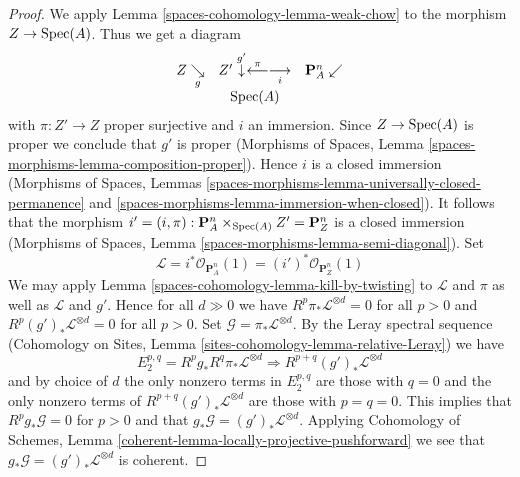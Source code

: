 \begin{proof}
\medskip\noindent
We apply Lemma \ref{spaces-cohomology-lemma-weak-chow} to the morphism $Z \to \operatorname{Spec}(A)$.
Thus we get a diagram
$$
\begin{array}{ccc}Z \underset{g}{\searrow} & Z' \overset{g'}{\downarrow}\overset{\pi}{\longleftarrow}\underset{i}{\longrightarrow} & \mathbf{P}^n_A \swarrow \\  & \operatorname{Spec}(A) & \end{array}
$$
with $\pi : Z' \to Z$ proper surjective and $i$ an immersion.
Since $Z \to \operatorname{Spec}(A)$ is proper we conclude that $g'$ is proper
(Morphisms of Spaces, Lemma \ref{spaces-morphisms-lemma-composition-proper}).
Hence $i$ is a closed immersion
(Morphisms of Spaces, Lemmas
\ref{spaces-morphisms-lemma-universally-closed-permanence} and
\ref{spaces-morphisms-lemma-immersion-when-closed}).
It follows that the morphism
$i' = (i, \pi) : \mathbf{P}^n_A \times_{\operatorname{Spec}(A)} Z' = \mathbf{P}^n_Z$ is
a closed immersion
(Morphisms of Spaces, Lemma \ref{spaces-morphisms-lemma-semi-diagonal}).
Set
$$
\mathcal{L} =
i^*\mathcal{O}_{\mathbf{P}^n_A}(1) =
(i')^*\mathcal{O}_{\mathbf{P}^n_Z}(1)
$$
We may apply Lemma \ref{spaces-cohomology-lemma-kill-by-twisting}
to $\mathcal{L}$ and $\pi$ as well as $\mathcal{L}$ and $g'$.
Hence for all $d \gg 0$ we have
$R^p\pi_*\mathcal{L}^{\otimes d} = 0$ for all $p > 0$ and
$R^p(g')_*\mathcal{L}^{\otimes d} = 0$ for all $p > 0$.
Set $\mathcal{G} = \pi_*\mathcal{L}^{\otimes d}$.
By the Leray spectral sequence
(Cohomology on Sites, Lemma \ref{sites-cohomology-lemma-relative-Leray})
we have
$$
E_2^{p, q} = R^pg_* R^q\pi_*\mathcal{L}^{\otimes d}
\Rightarrow
R^{p + q}(g')_*\mathcal{L}^{\otimes d}
$$
and by choice of $d$ the only nonzero terms in $E_2^{p, q}$ are
those with $q = 0$ and the only nonzero terms of
$R^{p + q}(g')_*\mathcal{L}^{\otimes d}$ are those with $p = q = 0$.
This implies that $R^pg_*\mathcal{G} = 0$ for $p > 0$ and
that $g_*\mathcal{G} = (g')_*\mathcal{L}^{\otimes d}$.
Applying
Cohomology of Schemes, Lemma
\ref{coherent-lemma-locally-projective-pushforward}
we see that $g_*\mathcal{G} = (g')_*\mathcal{L}^{\otimes d}$ is
coherent.


\end{proof}
